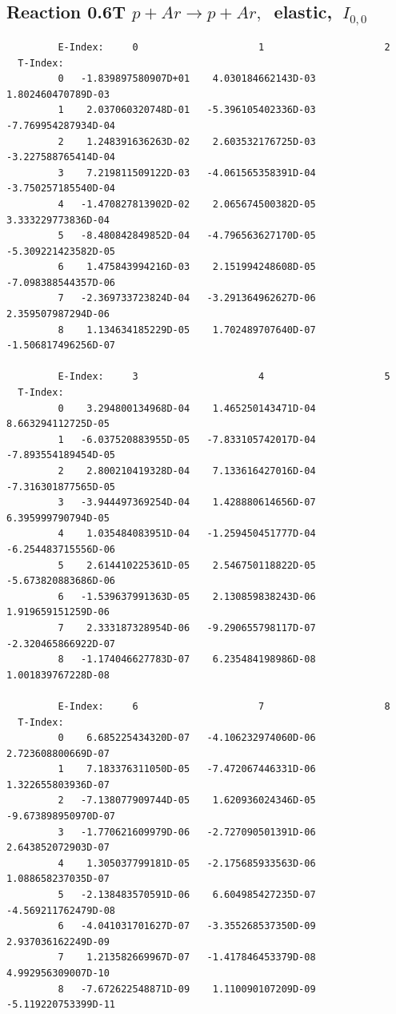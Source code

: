 \documentclass[12pt,dvips]{article}
\begin{document}
\subsection{
Reaction 0.6T  $p + Ar \rightarrow p + Ar ,\ $
 elastic, $\  I_{0,0}$
}

\begin{small}\begin{verbatim}
         E-Index:     0                     1                     2
  T-Index:
         0   -1.839897580907D+01    4.030184662143D-03    1.802460470789D-03
         1    2.037060320748D-01   -5.396105402336D-03   -7.769954287934D-04
         2    1.248391636263D-02    2.603532176725D-03   -3.227588765414D-04
         3    7.219811509122D-03   -4.061565358391D-04   -3.750257185540D-04
         4   -1.470827813902D-02    2.065674500382D-05    3.333229773836D-04
         5   -8.480842849852D-04   -4.796563627170D-05   -5.309221423582D-05
         6    1.475843994216D-03    2.151994248608D-05   -7.098388544357D-06
         7   -2.369733723824D-04   -3.291364962627D-06    2.359507987294D-06
         8    1.134634185229D-05    1.702489707640D-07   -1.506817496256D-07

         E-Index:     3                     4                     5
  T-Index:
         0    3.294800134968D-04    1.465250143471D-04    8.663294112725D-05
         1   -6.037520883955D-05   -7.833105742017D-04   -7.893554189454D-05
         2    2.800210419328D-04    7.133616427016D-04   -7.316301877565D-05
         3   -3.944497369254D-04    1.428880614656D-07    6.395999790794D-05
         4    1.035484083951D-04   -1.259450451777D-04   -6.254483715556D-06
         5    2.614410225361D-05    2.546750118822D-05   -5.673820883686D-06
         6   -1.539637991363D-05    2.130859838243D-06    1.919659151259D-06
         7    2.333187328954D-06   -9.290655798117D-07   -2.320465866922D-07
         8   -1.174046627783D-07    6.235484198986D-08    1.001839767228D-08

         E-Index:     6                     7                     8
  T-Index:
         0    6.685225434320D-07   -4.106232974060D-06    2.723608800669D-07
         1    7.183376311050D-05   -7.472067446331D-06    1.322655803936D-07
         2   -7.138077909744D-05    1.620936024346D-05   -9.673898950970D-07
         3   -1.770621609979D-06   -2.727090501391D-06    2.643852072903D-07
         4    1.305037799181D-05   -2.175685933563D-06    1.088658237035D-07
         5   -2.138483570591D-06    6.604985427235D-07   -4.569211762479D-08
         6   -4.041031701627D-07   -3.355268537350D-09    2.937036162249D-09
         7    1.213582669967D-07   -1.417846453379D-08    4.992956309007D-10
         8   -7.672622548871D-09    1.110090107209D-09   -5.119220753399D-11
\end{verbatim}\end{small}
\end{document}
